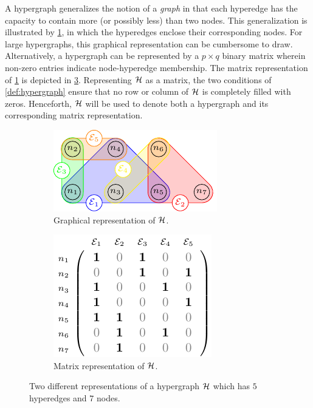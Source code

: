 \documentclass[aps, 10pt, english, twoside, twocolumn, pra, nofootinbib, tightenlines, longbibliography, superscriptaddress]{revtex4-1}
\begin{document}
    A hypergraph generalizes the notion of a \textit{graph} in that each hyperedge has the capacity to contain more (or possibly less) than two nodes. This generalization is illustrated by \cref{fig:hypergraph_diagram_example}, in which the hyperedges enclose their corresponding nodes. For large hypergraphs, this graphical representation can be cumbersome to draw. Alternatively, a hypergraph can be represented by a $p\times q$ binary matrix wherein non-zero entries indicate node-hyperedge membership. The matrix representation of \cref{fig:hypergraph_diagram_example} is depicted in \cref{fig:hypergraph_matrix_example}. Representing $\mathcal{H}$ as a matrix, the two conditions of \cref{def:hypergraph} ensure that no row or column of $\mathcal{H}$ is completely filled with zeros. Henceforth, $\mathcal{H}$ will be used to denote both a hypergraph and its corresponding matrix representation.
    \begin{figure}
    \begin{subfigure}{\linewidth}
        \includegraphics[width=\linewidth]{figures/hypergraph_diagram_1_standalone/figure.pdf}
        \caption{Graphical representation of $\mathcal{H}$.}
        \label{fig:hypergraph_diagram_example}
    \end{subfigure}
    \begin{subfigure}{0.8\linewidth}
        \includegraphics[width=0.8\linewidth]{figures/hypergraph_matrix_1_standalone/figure.pdf}
        \caption{Matrix representation of $\mathcal{H}$.}
        \label{fig:hypergraph_matrix_example}
    \end{subfigure}
    \caption{Two different representations of a hypergraph $\mathcal{H}$ which has $5$ hyperedges and $7$ nodes.}
    \end{figure}
\end{document}
